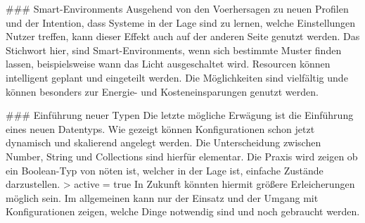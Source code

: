 ### Smart-Environments
Ausgehend von den Voerhersagen zu neuen Profilen und der Intention, dass Systeme in der Lage sind zu lernen, welche Einstellungen Nutzer treffen, kann dieser Effekt auch auf der anderen Seite genutzt werden. Das Stichwort hier, sind Smart-Environments, wenn sich bestimmte Muster finden lassen, beispielsweise wann das Licht ausgeschaltet wird. Resourcen können intelligent geplant und eingeteilt werden. Die Möglichkeiten sind vielfältig unde können besonders zur Energie- und Kosteneinsparungen genutzt werden.

### Einführung neuer Typen
Die letzte mögliche Erwägung ist die Einführung eines neuen Datentyps. Wie gezeigt können Konfigurationen schon jetzt dynamisch und skalierend angelegt werden. Die Unterscheidung zwischen Number, String und Collections sind hierfür elementar. Die Praxis wird zeigen ob ein Boolean-Typ von nöten ist, welcher in der Lage ist, einfache Zustände darzustellen.
> active = true
In Zukunft könnten hiermit größere Erleicherungen möglich sein. Im allgemeinen kann nur der Einsatz und der Umgang mit Konfigurationen zeigen, welche Dinge notwendig sind und noch gebraucht werden. 



